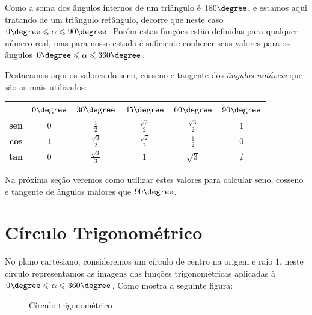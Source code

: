  \vskip0.3cm

 Como a soma dos ângulos internos de um triângulo é $180 \degree$, e estamos aqui tratando de um triângulo retângulo, decorre que neste caso $0 \degree \leqslant \alpha \leqslant 90 \degree$. Porém estas funções estão definidas para qualquer número real, mas para nosso estudo é suficiente conhecer seus valores para os ângulos $0 \degree \leqslant \alpha \leqslant 360 \degree$.

 Destacamos aqui os valores do seno, cosseno e tangente dos \emph{ângulos notáveis} que são os mais utilizados:

 \begin{table}[H]
 \centering
 \begin{tabular}{|c|c|c|c|c|c|} \hline
 \rowcolor{cinza}
               & $0 \degree$  & $30 \degree$  & $45 \degree$  & $60 \degree$ & $90 \degree$  \\\hline
  \textbf{sen} & $0$ &$\frac{1}{2}$ & $\frac{\sqrt{2}}{2}$ & $\frac{\sqrt{3}}{2}$ & $1$ \\\hline
  \textbf{cos} & $1$ & $\frac{\sqrt{3}}{2}$ & $\frac{\sqrt{2}}{2}$ & $\frac{1}{2}$ & $0$ \\\hline
  \textbf{tan} & $0$ & $\frac{\sqrt{3}}{3}$ & $1$ & $\sqrt{3}$ & $\nexists$ \\\hline
 \end{tabular}
\end{table}
 Na próxima seção veremos como utilizar estes valores para calcular seno, cosseno e tangente de ângulos maiores que $90 \degree$.

\section{Círculo Trigonométrico}

 No plano cartesiano, consideremos um círculo de centro na origem e raio $1$, neste círculo representamos as imagens das funções trigonométricas aplicadas à  $0 \degree \leqslant \alpha \leqslant 360 \degree$. Como mostra a seguinte figura:
 \begin{figure}[H]
   \centering
   \caption{Círculo trigonométrico}
  \end{figure}

